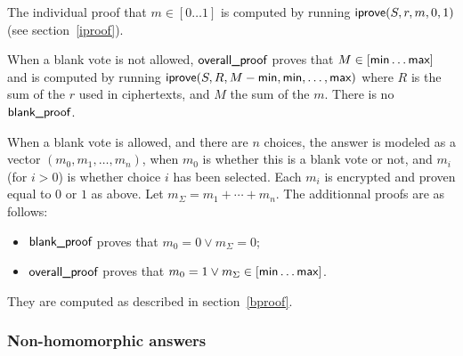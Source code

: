\documentclass[a4paper]{article}
\begin{document}
The individual proof that $m\in[0\dots1]$ is computed by running
$\textsf{iprove}(S,r,m,0,1)$ (see section~\ref{iproof}).

When a blank vote is not allowed, $\textsf{overall\_proof}$ proves that
$M\in[\textsf{min}\dots\textsf{max}]$ and is computed by running
$\textsf{iprove}(S,R,M-\textsf{min},\textsf{min},\dots,\textsf{max})$ where $R$ is the
sum of the $r$ used in ciphertexts, and $M$ the sum of the $m$. There
is no $\textsf{blank\_proof}$.

When a blank vote is allowed, and there are $n$ choices, the answer is
modeled as a vector $(m_0,m_1,\dotsc,m_n)$, when $m_0$ is whether this
is a blank vote or not, and $m_i$ (for $i>0$) is whether choice $i$
has been selected. Each $m_i$ is encrypted and proven equal to $0$ or
$1$ as above. Let $m_\Sigma=m_1+\dotsb+m_n$. The additionnal proofs
are as follows:
\begin{itemize}
\item $\textsf{blank\_proof}$ proves that $m_0=0\lor m_\Sigma=0$;
\item $\textsf{overall\_proof}$ proves that $m_0=1\lor m_\Sigma\in[\textsf{min}\dots\textsf{max}]$.
\end{itemize}
They are computed as described in section~\ref{bproof}.

\subsubsection{Non-homomorphic answers}
\label{nh-answers}
\end{document}
